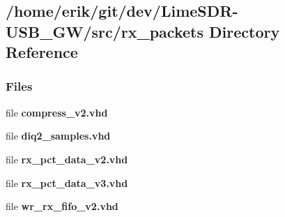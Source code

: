 \subsection{/home/erik/git/dev/\+Lime\+S\+D\+R-\/\+U\+S\+B\+\_\+\+G\+W/src/rx\+\_\+packets Directory Reference}
\label{dir_d4cc78320cf5ac4920727ae805bb167b}
\subsubsection*{Files}
\begin{DoxyCompactItemize}
\item 
file {\bf compress\+\_\+v2.\+vhd}
\item 
file {\bf diq2\+\_\+samples.\+vhd}
\item 
file {\bf rx\+\_\+pct\+\_\+data\+\_\+v2.\+vhd}
\item 
file {\bf rx\+\_\+pct\+\_\+data\+\_\+v3.\+vhd}
\item 
file {\bf wr\+\_\+rx\+\_\+fifo\+\_\+v2.\+vhd}
\end{DoxyCompactItemize}
